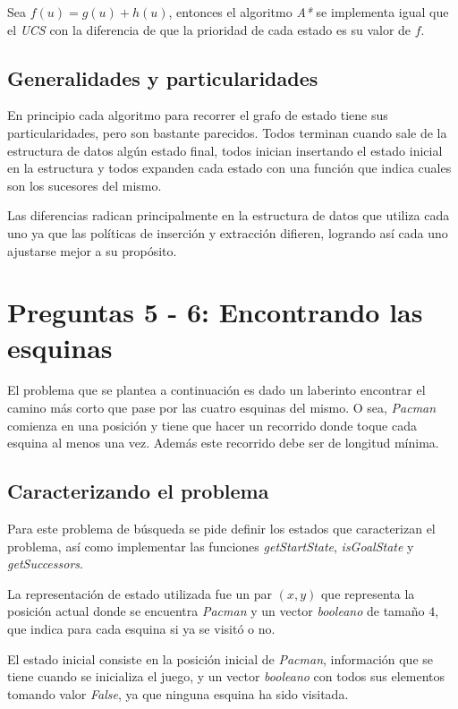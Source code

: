 \documentclass[12pt]{article}
\begin{document}
Sea $f(u) = g(u) + h(u)$, entonces el algoritmo \emph{A*} se implementa igual que el \emph{UCS} con la diferencia de que la prioridad de cada estado es su valor de $f$.

\subsection{Generalidades y particularidades}
En principio cada algoritmo para recorrer el grafo de estado tiene sus particularidades, pero son bastante parecidos. Todos terminan cuando sale de la estructura de datos alg\'un estado final, todos inician insertando el estado inicial en la estructura y todos expanden cada estado con una funci\'on que indica cuales son los sucesores del mismo.

Las diferencias radican principalmente en la estructura de datos que utiliza cada uno ya que las pol\'iticas de inserci\'on y extracci\'on difieren, logrando as\'i cada uno ajustarse mejor a su prop\'osito.


\section{Preguntas 5 - 6: Encontrando las esquinas}

El problema que se plantea a continuaci\'on es dado un laberinto encontrar el camino m\'as corto que pase por las cuatro esquinas del mismo. O sea, \emph{Pacman} comienza en una posici\'on y tiene que hacer un recorrido donde toque cada esquina al menos una vez. Adem\'as este recorrido debe ser de longitud m\'inima.

\subsection{Caracterizando el problema}

Para este problema de b\'usqueda se pide definir los estados que caracterizan el problema, as\'i como implementar las funciones \emph{getStartState}, \emph{isGoalState} y \emph{getSuccessors}.

La representaci\'on de estado utilizada fue un par $(x, y)$ que representa la posici\'on actual donde se encuentra \emph{Pacman} y un vector \emph{booleano} de tama\~no $4$, que indica para cada esquina si ya se visit\'o o no.

El estado inicial consiste en la posici\'on inicial de \emph{Pacman}, informaci\'on que se tiene cuando se inicializa el juego, y un vector \emph{booleano} con todos sus elementos tomando valor \emph{False}, ya que ninguna esquina ha sido visitada.
\end{document}
